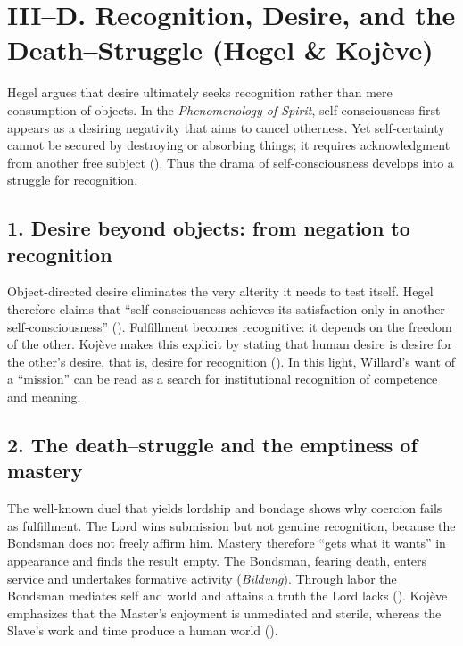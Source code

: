 \section*{III--D. Recognition, Desire, and the Death--Struggle (Hegel \& Koj{\`e}ve)}

Hegel argues that desire ultimately seeks recognition rather than mere consumption of objects. In the \emph{Phenomenology of Spirit}, self-consciousness first appears as a desiring negativity that aims to cancel otherness. Yet self-certainty cannot be secured by destroying or absorbing things; it requires acknowledgment from another free subject (\parencite[§§ 167--175]{HegelPhenomenology1977}). Thus the drama of self-consciousness develops into a struggle for recognition.

\subsection*{1. Desire beyond objects: from negation to recognition}
Object-directed desire eliminates the very alterity it needs to test itself. Hegel therefore claims that ``self-consciousness achieves its satisfaction only in another self-consciousness'' (\parencite{HegelPhenomenology1977}). Fulfillment becomes recognitive: it depends on the freedom of the other. Koj{\`e}ve makes this explicit by stating that human desire is desire for the other's desire, that is, desire for recognition (\parencite[p.~6]{KojeveIRH1980}). In this light, Willard's want of a ``mission'' can be read as a search for institutional recognition of competence and meaning.

\subsection*{2. The death--struggle and the emptiness of mastery}
The well-known duel that yields lordship and bondage shows why coercion fails as fulfillment. The Lord wins submission but not genuine recognition, because the Bondsman does not freely affirm him. Mastery therefore ``gets what it wants'' in appearance and finds the result empty. The Bondsman, fearing death, enters service and undertakes formative activity (\emph{Bildung}). Through labor the Bondsman mediates self and world and attains a truth the Lord lacks (\parencite[\S 175]{HegelPhenomenology1977}). Koj{\`e}ve emphasizes that the Master's enjoyment is unmediated and sterile, whereas the Slave's work and time produce a human world (\parencite{KojeveIRH1980}).

